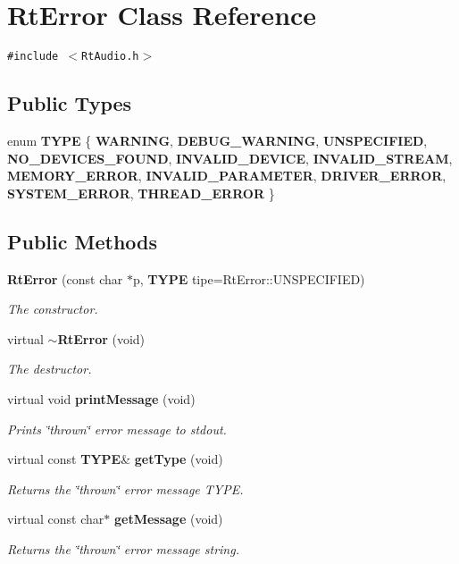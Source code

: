 \section{Rt\-Error  Class Reference}
\label{classRtError}
{\tt \#include $<$Rt\-Audio.h$>$}

\subsection*{Public Types}
\begin{CompactItemize}
\item 
enum {\bf TYPE} \{ {\bf WARNING}, 
{\bf DEBUG\_\-WARNING}, 
{\bf UNSPECIFIED}, 
{\bf NO\_\-DEVICES\_\-FOUND}, 
{\bf INVALID\_\-DEVICE}, 
{\bf INVALID\_\-STREAM}, 
{\bf MEMORY\_\-ERROR}, 
{\bf INVALID\_\-PARAMETER}, 
{\bf DRIVER\_\-ERROR}, 
{\bf SYSTEM\_\-ERROR}, 
{\bf THREAD\_\-ERROR}
 \}
\end{CompactItemize}
\subsection*{Public Methods}
\begin{CompactItemize}
\item 
{\bf Rt\-Error} (const char $\ast$p, {\bf TYPE} tipe=Rt\-Error::UNSPECIFIED)
\begin{CompactList}\small\item\em The constructor.\item\end{CompactList}\item 
virtual {\bf $\sim$Rt\-Error} (void)
\begin{CompactList}\small\item\em The destructor.\item\end{CompactList}\item 
virtual void {\bf print\-Message} (void)
\begin{CompactList}\small\item\em Prints \char`\"{}thrown\char`\"{} error message to stdout.\item\end{CompactList}\item 
virtual const {\bf TYPE}\& {\bf get\-Type} (void)
\begin{CompactList}\small\item\em Returns the \char`\"{}thrown\char`\"{} error message TYPE.\item\end{CompactList}\item 
virtual const char$\ast$ {\bf get\-Message} (void)
\begin{CompactList}\small\item\em Returns the \char`\"{}thrown\char`\"{} error message string.\item\end{CompactList}\end{CompactItemize}
